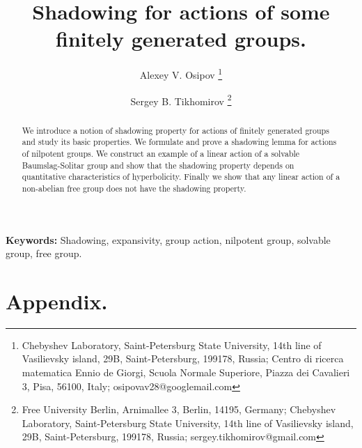 \documentclass[12pt]{article}
\title{Shadowing for actions of some finitely generated groups.}
\author{Alexey V. Osipov
\footnote{Chebyshev Laboratory, Saint-Petersburg State University,
14th line of Vasilievsky island, 29B, Saint-Petersburg, 199178, Russia;
Centro di ricerca matematica Ennio de Giorgi, Scuola Normale Superiore,
Piazza dei Cavalieri 3,
Pisa, 56100, Italy;
osipovav28@googlemail.com}
\and
Sergey B. Tikhomirov \footnote{Free University Berlin, Arnimallee 3, Berlin, 14195, Germany; Chebyshev Laboratory, Saint-Petersburg State University,
14th line of Vasilievsky island, 29B, Saint-Petersburg, 199178, Russia; sergey.tikhomirov@gmail.com}
}
\theoremstyle{plain}
\theoremstyle{definition}
\begin{document}
\newcommand{\ep}{\varepsilon}
\newcommand{\lam}{\lambda}
\newcommand{\sref}[1]{(\ref{#1})}
\newcommand{\ZZ}{\mathds{Z}}
\newcommand{\RR}{\mathds{R}}

\maketitle

\begin{abstract}
We introduce a notion of shadowing property for actions of finitely generated groups and study its basic properties. We formulate and prove a shadowing lemma for actions of nilpotent groups. We construct an example of a linear action of a solvable Baumslag-Solitar group and show that the shadowing property depends on quantitative characteristics of hyperbolicity. Finally we show that any linear action of a non-abelian free group does not have the shadowing property.
\end{abstract}

\textbf{Keywords:} Shadowing, expansivity, group action, nilpotent group, solvable group, free group.















\section{Appendix.}
\end{document}
